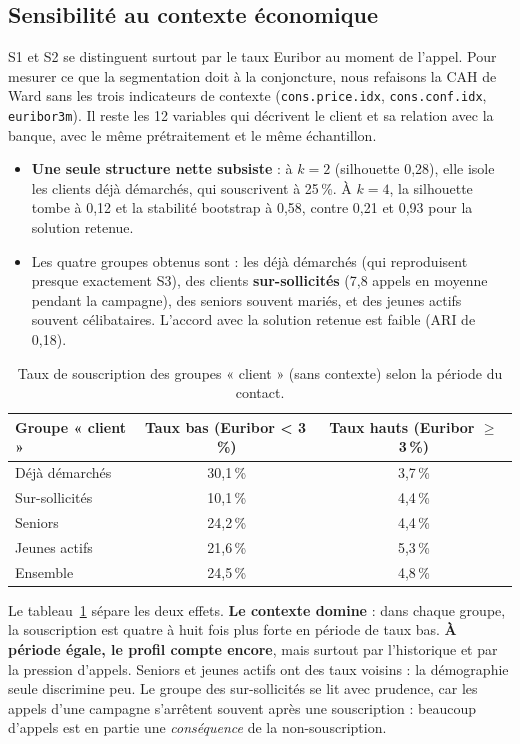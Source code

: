 \documentclass[11pt,a4paper]{article}
\begin{document}
\subsection{Sensibilité au contexte économique}
S1 et S2 se distinguent surtout par le taux Euribor au moment de l'appel. Pour mesurer ce que la segmentation doit à la conjoncture, nous refaisons la CAH de Ward sans les trois indicateurs de contexte (\texttt{cons.price.idx}, \texttt{cons.conf.idx}, \texttt{euribor3m}). Il reste les 12 variables qui décrivent le client et sa relation avec la banque, avec le même prétraitement et le même échantillon.

\begin{itemize}
\item \textbf{Une seule structure nette subsiste} : à $k=2$ (silhouette 0,28), elle isole les clients déjà démarchés, qui souscrivent à 25\,\%. À $k=4$, la silhouette tombe à 0,12 et la stabilité bootstrap à 0,58, contre 0,21 et 0,93 pour la solution retenue.
\item Les quatre groupes obtenus sont : les déjà démarchés (qui reproduisent presque exactement S3), des clients \textbf{sur-sollicités} (7,8 appels en moyenne pendant la campagne), des seniors souvent mariés, et des jeunes actifs souvent célibataires. L'accord avec la solution retenue est faible (ARI de 0,18).
\end{itemize}

\begin{table}[H]\centering\small
\caption{Taux de souscription des groupes « client » (sans contexte) selon la période du contact.}\label{tab:ctx}
\begin{tabular}{|l|c|c|}
\hline
\textbf{Groupe « client »} & \textbf{Taux bas (Euribor < 3\,\%)} & \textbf{Taux hauts (Euribor $\geq$ 3\,\%)}\\ \hline
Déjà démarchés      & 30,1\,\% & 3,7\,\%\\ \hline
Sur-sollicités      & 10,1\,\% & 4,4\,\%\\ \hline
Seniors             & 24,2\,\% & 4,4\,\%\\ \hline
Jeunes actifs       & 21,6\,\% & 5,3\,\%\\ \hline
Ensemble            & 24,5\,\% & 4,8\,\%\\ \hline
\end{tabular}
\end{table}

Le tableau~\ref{tab:ctx} sépare les deux effets. \textbf{Le contexte domine} : dans chaque groupe, la souscription est quatre à huit fois plus forte en période de taux bas. \textbf{À période égale, le profil compte encore}, mais surtout par l'historique et par la pression d'appels. Seniors et jeunes actifs ont des taux voisins : la démographie seule discrimine peu. Le groupe des sur-sollicités se lit avec prudence, car les appels d'une campagne s'arrêtent souvent après une souscription : beaucoup d'appels est en partie une \emph{conséquence} de la non-souscription.
\end{document}

